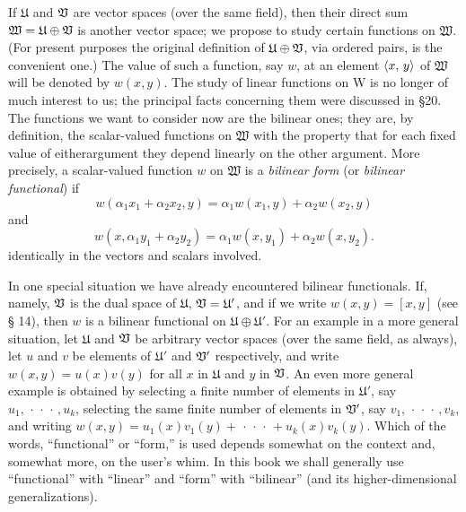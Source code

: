 If \(\mathfrak{U}\) and \(\mathfrak{V}\) are vector spaces (over the same field), then
their direct sum \(\mathfrak{W} = \mathfrak{U} \oplus \mathfrak{V}\) is another vector space;
we propose to study certain functions on \(\mathfrak{W}\). (For present purposes the
original definition of \(\mathfrak{U} \oplus \mathfrak{V}\), via ordered pairs, is the
convenient one.) The value of such a function, say \(w\), at an element
\(\left\langle x,\,y\right\rangle\) of \(\mathfrak{W}\) will be denoted by \(w(x, y)\). The study of
linear functions on W is no longer of much interest to us; the principal facts
concerning them were discussed in §20. The functions we want to consider now are
the bilinear ones; they are, by definition, the scalar-valued functions on
\(\mathfrak{W}\) with the property that for each fixed value of eitherargument they
depend linearly on the other argument. More precisely, a scalar-valued function
\(w\) on \(\mathfrak{W}\) is a \emph{bilinear form} (or \emph{bilinear functional})
if
\begin{equation*}
    w(\alpha_1 x_1 + \alpha_2 x_2, y) = \alpha_1 w(x_1, y) + \alpha_2 w(x_2, y)
\end{equation*}
and
\begin{equation*}
    w(x, \alpha_1 y_1 + \alpha_2 y_2) = \alpha_1 w(x, y_1) + \alpha_2 w(x, y_2).
\end{equation*}
identically in the vectors and scalars involved.

In one special situation we have already encountered bilinear functionals. If,
namely, \(\mathfrak{V}\) is the dual space of \(\mathfrak{U}\), \(\mathfrak{V} = \mathfrak{U}'\),
and if we write \(w(x,y) = [x, y]\) (see § 14), then \(w\) is a bilinear
functional on \(\mathfrak{U} \oplus \mathfrak{U}'\). For an example in a more general
situation, let \(\mathfrak{U}\) and \(\mathfrak{V}\) be arbitrary vector spaces (over the
same field, as always), let \(u\) and \(v\) be elements of \(\mathfrak{U}'\) and
\(\mathfrak{V}'\) respectively, and write \(w(x, y) = u(x)v(y)\) for all \(x\) in
\(\mathfrak{U}\) and \(y\) in \(\mathfrak{V}\). An even more general example is obtained
by selecting a finite number of elements in \(\mathfrak{U}'\), say \(u_1,
\,\cdot\,\cdot\,\cdot\,, u_k\), selecting the same finite number of elements in
\(\mathfrak{V}'\), say \(v_1, \,\cdot\,\cdot\,\cdot\,, v_k\), and writing \(w(x,y) =
u_1(x)v_1(y) + \,\cdot\,\cdot\,\cdot\, + u_k(x)v_k(y)\). Which of the words,
``functional'' or ``form,'' is used depends somewhat on the context and,
somewhat more, on the user's whim. In this book we shall generally use
``functional'' with ``linear'' and ``form'' with ``bilinear'' (and its
higher-dimensional generalizations).

